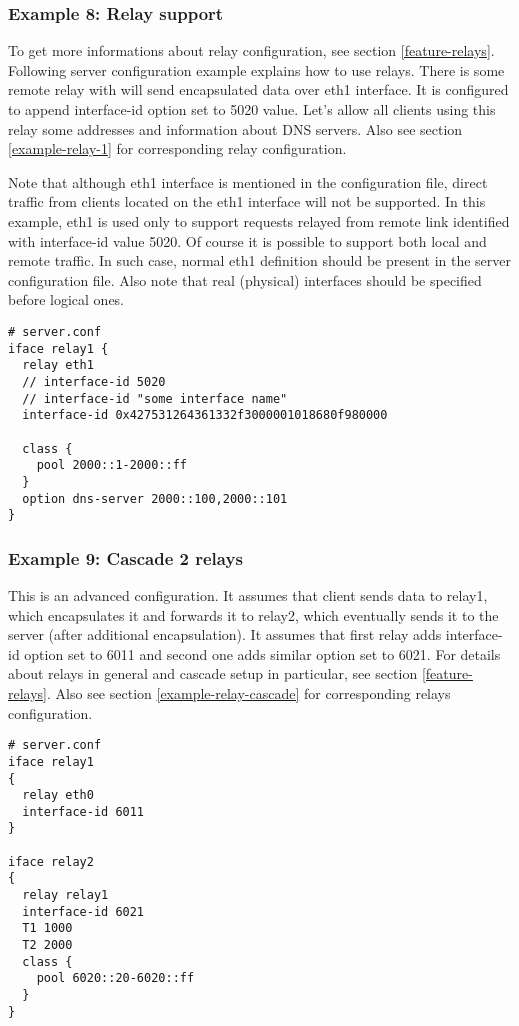 \subsubsection{Example 8: Relay support}
\label{example-server-relay1}
To get more informations about relay configuration, see section \ref{feature-relays}.
Following server configuration example explains how to use
relays. There is some remote relay with will send encapsulated data over
eth1 interface. It is configured to append interface-id option set to
5020 value. Let's allow all clients using this relay some addresses
and information about DNS servers. Also see section
\ref{example-relay-1} for corresponding relay configuration.

Note that although eth1 interface is mentioned in the configuration file,
direct traffic from clients located on the eth1 interface will not be
supported. In this example, eth1 is used only to support requests
relayed from remote link identified with interface-id value 5020.
Of course it is possible to support both local and remote traffic. In
such case, normal eth1 definition should be present in the server
configuration file. Also note that real (physical) interfaces should
be specified before logical ones.

\begin{lstlisting}
# server.conf
iface relay1 {
  relay eth1
  // interface-id 5020
  // interface-id "some interface name"
  interface-id 0x427531264361332f3000001018680f980000

  class {
    pool 2000::1-2000::ff
  }
  option dns-server 2000::100,2000::101
}
\end{lstlisting}

\subsubsection{Example 9: Cascade 2 relays}
\label{example-server-relay2}
This is an advanced configuration. It assumes that client sends data to
relay1, which encapsulates it and forwards it to relay2, which
eventually sends it to the server (after additional encapsulation). It
assumes that first relay adds interface-id option set to 6011 and
second one adds similar option set to 6021. For details about relays
in general and cascade setup in particular, see section
\ref{feature-relays}. Also see section \ref{example-relay-cascade}
for corresponding relays configuration.

\begin{lstlisting}
# server.conf
iface relay1
{
  relay eth0
  interface-id 6011
}

iface relay2
{
  relay relay1
  interface-id 6021
  T1 1000
  T2 2000
  class {
    pool 6020::20-6020::ff
  }
}
\end{lstlisting}

